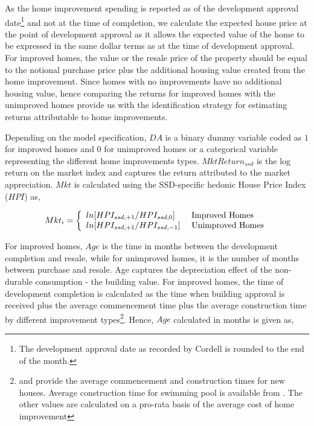 \documentclass[AEJ,reqno, draftmode]{AEA} %
\begin{document}
As the home improvement spending is reported as of the development approval date\footnote{The development approval date as recorded by Cordell is rounded to the end of the month.} and not at the time of completion, we calculate the expected house price at the point of development approval as it allows the expected value of the home to be expressed in the same dollar terms as at the time of development approval. For improved homes, the value or the resale price of the property should be equal to the notional purchase price plus the additional housing value created from the home improvement. Since homes with no improvements have no additional housing value, hence comparing the returns for improved homes with the unimproved homes provide us with the identification strategy for estimating returns attributable to home improvements. 

Depending on the model specification, $DA$ is a binary dummy variable coded as $1$ for improved homes and $0$ for unimproved homes or a categorical variable representing the different home improvements types. $MktReturn_{ssd}$ is the log return on the market index and captures the return attributed to the market appreciation. $Mkt$ is calculated using the SSD-specific hedonic House Price Index ($HPI$) as,

\begin{equation}
    Mkt_i = \left\{
    \begin{array}{l l}
      ln[HPI_{ssd,+1}/HPI_{ssd,0}] & \text{ Improved Homes}\\
      ln[HPI_{ssd,+1}/HPI_{ssd,-1}] & \text{ Unimproved Homes} \\
    \end{array} \right.
\end{equation}

For improved homes, $Age$ is the time in months between the development completion and resale, while for unimproved homes, it is the number of months between purchase and resale. Age captures the depreciation effect of the non-durable consumption - the building value. For improved homes, the time of development completion is calculated as the time when building approval is received plus the average commencement time plus the average construction time by different improvement types\footnote{\citet{abs_house_times_commence} and \citet{abs_house_times} provide the average commencement and construction times for new houses. Average construction time for swimming pool is available from \citep{hi_swimming_time}. The other values are calculated on a pro-rata basis of the average cost of home improvement}. Hence, $Age$ calculated in months is given as, 
\end{document}
